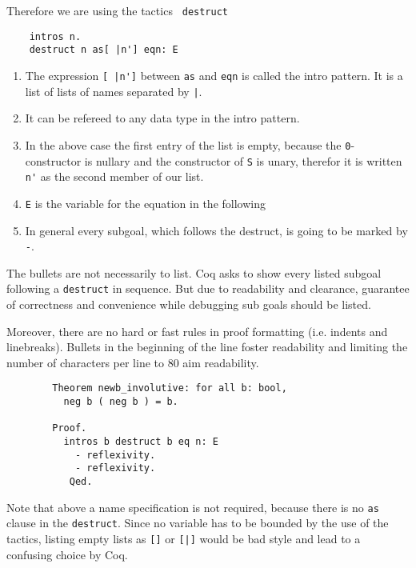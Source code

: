     Therefore we are using the tactics \lstinline! destruct!	
	\begin{lstlisting}
	intros n.
	destruct n as[ |n'] eqn: E
	\end{lstlisting}
	
	\begin{enumerate}
		\item The expression \lstinline![ |n']! between \lstinline!as! and \lstinline!eqn! is called the intro pattern. It is a list of lists of names separated by \lstinline!|!.
		\item It can be refereed to any data type in the intro pattern.
		\item In the above case the first entry of the list is empty, because the \lstinline!0!-constructor is nullary and the constructor of \lstinline!S! is unary, therefor it is written \lstinline!n'! as the second member of our list.
		\item \lstinline!E! is the variable for the equation in the following
		\item In general every subgoal, which follows the destruct, is going to be marked by \lstinline!-!.
	\end{enumerate} 
	
	The bullets are not necessarily to list. 
	Coq asks to show every listed subgoal following a \lstinline!destruct! in sequence.
	But due to readability and clearance, guarantee of correctness and convenience while debugging sub goals should be listed.
	
	Moreover, there are no hard or fast rules in proof formatting (i.e. indents and linebreaks). 
	Bullets in the beginning of the line foster readability and limiting the number of characters per line to 80 aim readability.
	
	\begin{example}
	  \begin{lstlisting}
	  	Theorem newb_involutive: for all b: bool,
	  	  neg b ( neg b ) = b.
	  	  
	  	Proof. 
	  	  intros b destruct b eq n: E
	  	    - reflexivity. 
	  	    - reflexivity. 
	  	   Qed.  
	  \end{lstlisting}
	\end{example}
	 
	 Note that above a name specification is not required, because there is no \lstinline!as! clause in the \lstinline!destruct!.
	 Since no variable has to be bounded by the use of the tactics, listing empty lists as \lstinline![]! or \lstinline![|]! would be bad style and lead to a confusing choice by Coq.
	 
